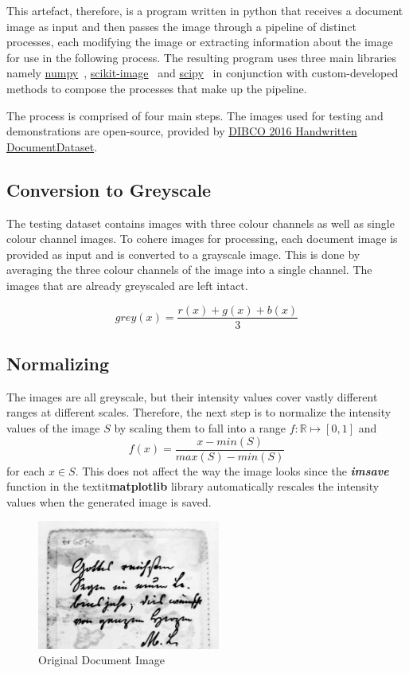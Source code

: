 \documentclass[a4paper, 12pt]{report}
\begin{document}
This artefact, therefore, is a program written in python that receives a document image as input and then passes the image through a pipeline of distinct processes, each modifying the image or extracting information about the image for use in the following process. The resulting program uses three main libraries namely \href{https://numpy.org/}{numpy}~\cite{numpy}, \href{https://scikit-image.org/}{scikit-image}~\cite{scikit-image} and \href{https://scikit-image.org/}{scipy}~\cite{2020SciPy-NMeth} in conjunction with custom-developed methods to compose the processes that make up the pipeline. \par

The process is comprised of four main steps. The images used for testing and
demonstrations are open-source, provided by \href{https://vc.ee.duth.gr/h-dibco2016/}{DIBCO 2016 Handwritten DocumentDataset}.

\subsection{Conversion to Greyscale}
The testing dataset contains images with three colour channels as well as single colour channel images. To cohere images for processing, each document image is provided as input and is converted to a grayscale image. This is done by averaging the three colour channels of the image into a single channel. The images that are already greyscaled are left intact.

\[grey(x)=\frac{r(x)+g(x)+b(x)}{3}\]

\subsection{Normalizing}
The images are all greyscale, but their intensity values cover vastly different ranges at different scales. Therefore, the next step is to normalize the intensity values of the image $S$ by scaling them to fall into a range $f:\mathbb{R} \mapsto [0,1]$ and
\[f(x)=\frac{x-min(S)}{max(S)-min(S)}\]
for each $x \in S$.
This does not affect the way the image looks since the \textit{\textbf{imsave}} function in the textit{\textbf{matplotlib}} library automatically rescales the intensity values when the generated image is saved.

\begin{figure}[ht]
    \centering
    \includegraphics[width=6cm]{original.png}
    \caption{Original Document Image}
    \label{fig:1}
\end{figure}
\end{document}

